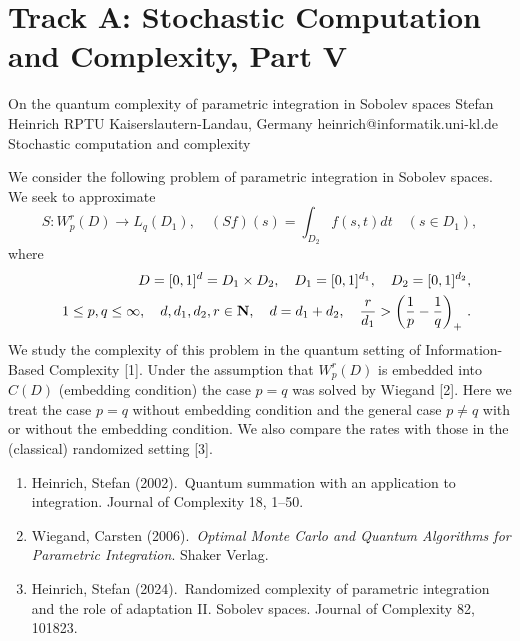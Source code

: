 \section{Track A: Stochastic Computation and Complexity, Part V}\newpage

\begin{talk}
  {On the quantum complexity of parametric integration in Sobolev spaces}%
  {Stefan Heinrich}%
  {RPTU Kaiserslautern-Landau, 
Germany}%
  {heinrich@informatik.uni-kl.de}%
  {}%
  {Stochastic computation and complexity}%
    
   
We consider the following problem of parametric integration in Sobolev spaces. We seek to approximate
$$
S:W_p^r(D)\to L_q(D_1), \quad (Sf)(s)=\int_{D_2}f(s,t)dt \quad (s\in D_1),
$$ 
where 
%
\begin{eqnarray*}
&&D=[0,1]^d=D_1\times D_2,\quad D_1=[0,1]^{d_1}, \quad D_2=[0,1]^{d_2}, 
\\
&&1\le p,q\le \infty, \quad d,d_1,d_2,r\in {\bf N},\quad d=d_1+d_2,\quad \frac{r}{d_1}>\left(\frac{1}{p}-\frac{1}{q}\right)_+\, .
\end{eqnarray*}
%
We study the complexity of this problem in the quantum setting of Information-Based Complexity [1]. Under the assumption that $W_p^r(D)$ is embedded into $C(D)$ (embedding condition) the case $p=q$ was solved by Wiegand [2]. Here we treat the case $p=q$ without embedding condition and the general case $p\ne q$ with or without the embedding condition. We also compare the rates with those in the (classical) randomized setting [3].


\medskip

\begin{enumerate}

\item[{[1]}] Heinrich, Stefan (2002).\  Quantum summation with an application to integration. 
Journal of Complexity 18, 1--50.
\item[{[2]}] Wiegand, Carsten (2006).\ {\it Optimal Monte Carlo and Quantum Algorithms for Parametric Integration}. Shaker Verlag.
\item[{[3]}] Heinrich, Stefan (2024).\  Randomized complexity of parametric integration and
the role of adaptation  II. Sobolev spaces. Journal of Complexity 82, 101823.
\end{enumerate}

\end{talk}


